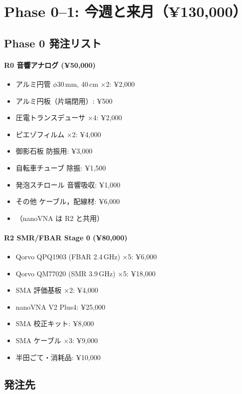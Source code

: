 \documentclass[11pt,a4paper]{article}
\begin{document}
\section{Phase 0--1: 今週と来月（¥130,000）}

\subsection{Phase 0 発注リスト}

\paragraph{R0 音響アナログ (¥50,000)}
\begin{itemize}
\item アルミ円管 $\phi 30$\,mm, 40\,cm ×2: ¥2,000
\item アルミ円板（片端閉用）: ¥500
\item 圧電トランスデューサ ×4: ¥2,000
\item ピエゾフィルム ×2: ¥4,000
\item 御影石板 防振用: ¥3,000
\item 自転車チューブ 除振: ¥1,500
\item 発泡スチロール 音響吸収: ¥1,000
\item その他 ケーブル，配線材: ¥6,000
\item （nanoVNA は R2 と共用）
\end{itemize}

\paragraph{R2 SMR/FBAR Stage 0 (¥80,000)}
\begin{itemize}
\item Qorvo QPQ1903 (FBAR 2.4\,GHz) ×5: ¥6,000
\item Qorvo QM77020 (SMR 3.9\,GHz) ×5: ¥18,000
\item SMA 評価基板 ×2: ¥4,000
\item nanoVNA V2 Plus4: ¥25,000
\item SMA 校正キット: ¥8,000
\item SMA ケーブル ×3: ¥9,000
\item 半田ごて・消耗品: ¥10,000
\end{itemize}

\subsection{発注先}
\end{document}
